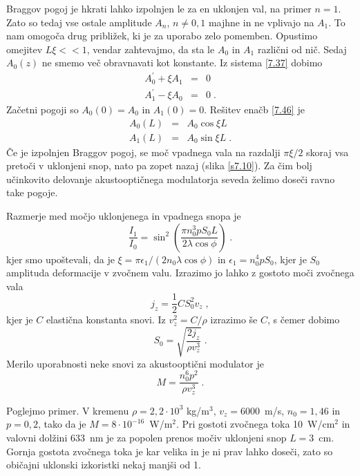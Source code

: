 Braggov pogoj je hkrati lahko izpolnjen le za en uklonjen val, na
primer $n=1$. Zato so tedaj vse ostale amplitude $A_{n}$, $n\ne0,1$
majhne in ne vplivajo na $A_{1}$. To nam omogoča drug približek,
ki je za uporabo zelo pomemben. Opustimo omejitev $L\xi<<1$, vendar
zahtevajmo, da sta le $A_{0}$ in $A_{1}$ različni od nič. Sedaj
$A_{0}(z)$ ne smemo več obravnavati kot konstante. Iz sistema \ref{7.37}
dobimo 
\begin{eqnarray}
A_{0}^{\prime}+\xi A_{1} & = & 0\nonumber \\
A_{1}^{\prime}-\xi A_{0} & = & 0\;.
\end{eqnarray}
 Začetni pogoji so $A_{0}(0)=A_{0}$ in $A_{1}(0)=0$. Rešitev enačb
\ref{7.46} je 
\begin{eqnarray}
A_{0}(L) & = & A_{0}\cos\xi L\nonumber \\
A_{1}(L) & = & A_{0}\sin\xi L\;.
\end{eqnarray}
 Če je izpolnjen Braggov pogoj, se moč vpadnega vala na razdalji $\pi\xi/2$
skoraj vsa pretoči v uklonjeni snop, nato pa zopet nazaj (slika \ref{s7.10}).
Za čim bolj učinkovito delovanje akustooptičnega modulatorja seveda
želimo doseči ravno take pogoje.

Razmerje med močjo uklonjenega in vpadnega snopa je 
\begin{equation}
\frac{I_{1}}{I_{0}}=\sin^{2}\left(\frac{\pi n_{0}^{3}pS_{0}L}{2\lambda\cos\phi}\right)\;.\label{7.48}
\end{equation}
 kjer smo upoštevali, da je $\xi=\pi\epsilon_{1}/(2n_{0}\lambda\cos\phi)$
in $\epsilon_{1}=n_{0}^{4}pS_{0}$, kjer je $S_{0}$ amplituda deformacije
v zvočnem valu. Izrazimo jo lahko z gostoto moči zvočnega vala 
\begin{equation}
j_{z}=\frac{1}{2}CS_{0}^{2}v_{z}\;,\label{7.49}
\end{equation}
 kjer je $C$ elastična konstanta snovi. Iz $v_{z}^{2}=C/\rho$ izrazimo
še $C$, s čemer dobimo 
\begin{equation}
S_{0}=\sqrt{\frac{2j_{z}}{\rho v_{z}^{3}}}\;.\label{7.50}
\end{equation}
 Merilo uporabnosti neke snovi za akustooptični modulator je 
\begin{equation}
M=\frac{n_{0}^{6}p^{2}}{\rho v_{z}^{3}}\;.\label{7.51}
\end{equation}


Poglejmo primer. V kremenu $\rho=2,2\cdot10^{3}$ kg/m$^{3}$, $v_{z}=6000$~m/s,
$n_{0}=1,46$ in $p=0,2$, tako da je $M=8\cdot10^{-16}$~W/m$^{2}$.
Pri gostoti zvočnega toka 10~W/cm$^{2}$ in valovni dolžini 633~nm
je za popolen prenos močiv uklonjeni snop $L=3$~cm. Gornja gostota
zvočnega toka je kar velika in je ni prav lahko doseči, zato so običajni
uklonski izkoristki nekaj manjši od 1.

